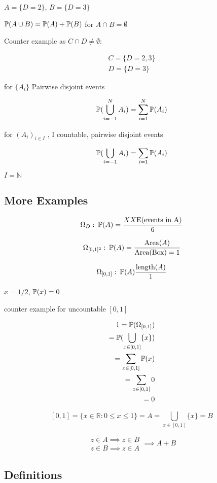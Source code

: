 $A=\{D=2\}$, $B=\{D=3\}$

$
\mathbb{P}(A\cup B)=\mathbb{P}(A)+\mathbb{P}(B)
$
 for $A\cap B=\emptyset$

Counter example as $C\cap D\neq\emptyset$:

\begin{align*}
C=\{D=2,3\}
\\
D=\{D=3\}
\end{align*}

for
$
\{A_i\}
$
Pairwise disjoint events

$$
\mathbb{P}( \bigcup_{i=-1}^{N} A_i )=\sum_{i=1}^{N}\mathbb{P}(A_i)
$$

for
$
(A_i)_{i\in I}
$
, I countable, pairwise disjoint events

$$
\mathbb{P}( \bigcup_{i=-1} A_i )=\sum_{i=1}\mathbb{P}(A_i)
$$

$I=\mathbb{N}$

\subsection{More Examples}

$$
\Omega_D: \: \mathbb{P}(A)=\frac{ XX \text{E(events in A)}}{6}
$$

$$
\Omega_{[0,1]^2}: \: \mathbb{P}(A)=\frac{\text{Area}(A)}{\text{Area(Box)}=1}
$$

$$
\Omega_{[0,1]}: \: \mathbb{P}(A)\frac{\text{length}(A)}{1}
$$

$x=1/2$, $\mathbb{P}(x)=0$

counter example for uncountable $[0,1]$

\begin{align*}
1=\mathbb{P}(\Omega_{[0,1]})
\\
=\mathbb{P}(\bigcup_{x\in[0,1]}\{x\})
\\
=\sum_{{x\in[0,1]}}\mathbb{P}(x)
\\
=\sum_{{x\in[0,1]}}0
\\
=0
\end{align*}

$$
[0,1]=\{ x\in\mathbb{R}:0\leq x\leq 1 \}=A=\bigcup_{{x\in[0,1]}}\{x\}=B
$$

$$
\begin{matrix}
z\in A\implies z\in B
\\
z\in B\implies z\in A
\end{matrix}
\implies
A+B
$$

\subsection{Definitions}


